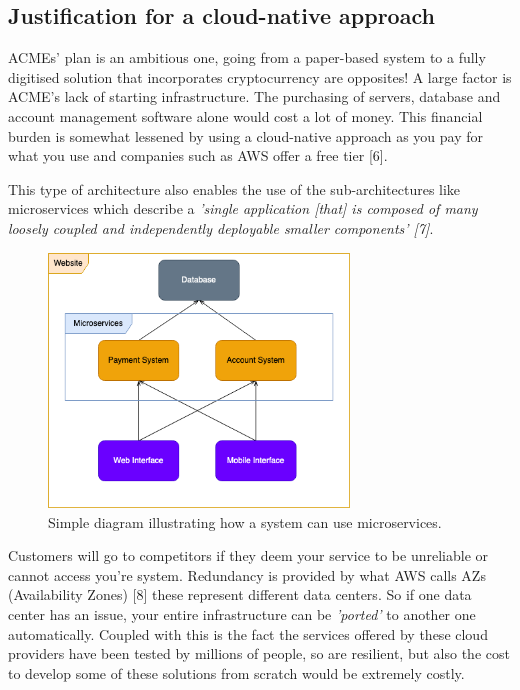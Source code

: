   \subsection{Justification for a cloud-native approach}
  ACMEs' plan is an ambitious one, going from a paper-based system to a fully digitised solution that incorporates cryptocurrency are opposites! A large 
  factor is ACME's lack of starting infrastructure. The purchasing of servers, database and account management software alone would
  cost a lot of money. This financial burden is somewhat lessened by using a cloud-native approach as you pay for what you use and companies such as AWS offer
  a free tier [6].
  
  This type of architecture also enables the use of the sub-architectures like microservices which describe a \textit{'single application [that] is 
  composed of many loosely coupled and independently deployable smaller components' [7]}.

  \begin{figure}[H]
    \centering
    \includegraphics[width=8cm]{assets/microservices.drawio.png}
    \caption{Simple diagram illustrating how a system can use microservices.}
    \label{fig:microservices}
  \end{figure}

  Customers will go to competitors if they deem your service to be unreliable or cannot access you're system. Redundancy is provided by what AWS calls 
  AZs (Availability Zones) [8] these represent different data centers. So if one data center has an issue, your entire infrastructure can be \textit{'ported'} 
  to another one automatically. Coupled with this is the fact the services offered by these cloud providers have been tested by millions of people, so are 
  resilient, but also the cost to develop some of these solutions from scratch would be extremely costly.

